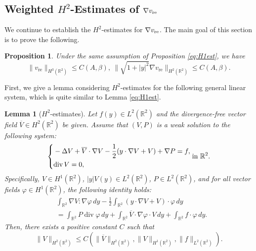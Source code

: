 \documentclass[12pt]{amsart}
\renewcommand{\div}{{\rm div \thinspace }}
\numberwithin{equation}{section}              %
\newtheorem{lemma}{Lemma}[section]
\newtheorem{proposition}{Proposition}[section]
\theoremstyle{remark}
\begin{document}
		\subsection{Weighted $H^2$-Estimates of $\nabla v_{\textnormal{re}}$}
        We continue to establish the  $H^2$-estimates for $\nabla v_{\textnormal{re}}$.
		The main goal of this section is to prove the following.
		\begin{proposition} \label{pro:H3}
			Under the same assumption of Proposition \ref{eq:H1est}, we have 
			\begin{equation*}
				\|v_{\text{re}} \|_{H^3(\mathbb{R}^2)}\leq C(A,\beta), ~\|\sqrt{1+|y|^2}\nabla v_{\text{re}} \|_{H^2(\mathbb{R}^2)}\leq C(A,\beta).
			\end{equation*}
		\end{proposition}
		First, we give a lemma considering $H^2$-estimates for  the following general linear system, which is quite similar to Lemma \ref{eq:H1est}.
		\begin{lemma}[$H^2$-estimates]\label{eq:H2est}
			Let $f(y) \in L^{2}(\mathbb{R}^{2})$ and the divergence-free vector field $\overline{V}\in H^2(\mathbb{R}^2)$ be given. Assume that $(V, P)$ is a weak solution to the following system:
			\begin{equation*}
            \left\{
				\begin{aligned}
				  &  -\Delta V + \overline{V} \cdot \nabla V - \dfrac{1}{2}(y \cdot \nabla V + V) + \nabla P = f , \\
					&\div V = 0,
				\end{aligned}
                \right. \text{in } \mathbb{R}^{2}.
			\end{equation*}
			Specifically, $V \in H^1(\mathbb{R}^{2})$, $|y|V(y) \in L^{2}(\mathbb{R}^{2})$, $P \in L^{2}(\mathbb{R}^{2})$, and for all vector fields $\varphi \in H^{1}(\mathbb{R}^{2})$, the following identity holds:
			\begin{equation}\label{eq:weak1}
				\begin{aligned}
					&\int_{\mathbb{R}^{2}} \nabla V : \nabla \varphi \, dy - \frac{1}{2} \int_{\mathbb{R}^{2}} (y \cdot \nabla V + V) \cdot \varphi \, dy \\
					&= \int_{\mathbb{R}^{2}} P \operatorname{div} \varphi \, dy + \int_{\mathbb{R}^{2}} \overline{V}\cdot \nabla \varphi \cdot V \, dy + \int_{\mathbb{R}^{2}} f \cdot \varphi \, dy.
				\end{aligned} 
			\end{equation}
			Then, there exists a  positive constant $C$ such that
			\begin{equation*}
				\|V\|_{H^{2}(\mathbb{R}^{2})} \leq C \left( \| \overline{V}\|_{H^{2}(\mathbb{R}^{2})}, \| V\|_{H^{1}(\mathbb{R}^{2})} ,\|f\|_{L^{2}(\mathbb{R}^{2})} \right).
			\end{equation*}
		\end{lemma} 
\end{document}
